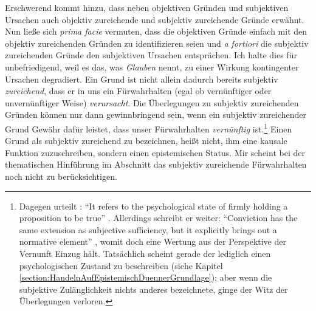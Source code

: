 Erschwerend kommt hinzu, dass  neben objektiven Gründen und
subjektiven Ursachen auch objektiv zureichende und subjektiv zureichende Gründe
erwähnt. Nun ließe sich \emph{prima facie} vermuten, dass die objektiven Gründe
einfach mit den objektiv zureichenden Gründen zu identifizieren seien und
\emph{a fortiori} die subjektiv zureichenden Gründe den subjektiven Ursachen
entsprächen. Ich halte dies für unbefriedigend, weil es das, was
 \emph{Glauben} nennt, zu einer Wirkung kontingenter
Ursachen degradiert. Ein Grund ist nicht allein dadurch bereits subjektiv
\emph{zureichend}, dass er in uns ein Fürwahrhalten (egal ob vernünftiger oder
unvernünftiger Weise) \emph{verursacht}.
Die Überlegungen zu subjektiv zureichenden Gründen können nur dann
gewinnbringend sein, wenn ein subjektiv zureichender Grund Gewähr dafür leistet,
dass unser Fürwahrhalten \emph{vernünftig} ist.\footnote{Dagegen urteilt
: \enquote{It refers to the
psychological state of firmly holding a proposition to be true}
\parencite[][43]{Pasternack:KantonOpinion2014}. Allerdings schreibt er weiter:
\enquote{Conviction has the same extension as subjective sufficiency, but it
explicitly brings out a normative element}
\parencite[][46]{Pasternack:KantonOpinion2014}, womit doch eine Wertung aus der
Perspektive der Vernunft Einzug hält.
Tatsächlich scheint gerade der  lediglich einen
psychologischen Zustand zu beschreiben (siehe Kapitel \ref{section:HandelnAufEpistemischDuennerGrundlage}); aber
wenn die subjektive Zulänglichkeit nichts anderes bezeichnete, ginge der Witz der Überlegungen
verloren.} Einen Grund als
subjektiv zureichend zu bezeichnen, heißt nicht, ihm eine kausale Funktion zuzuschreiben, sondern einen epistemischen Status. Mir scheint  bei der thematischen Hinführung im Abschnitt  das subjektiv zureichende Fürwahrhalten noch nicht zu berücksichtigen.

